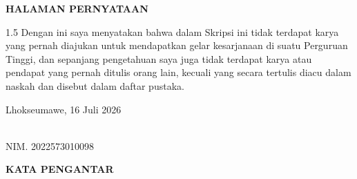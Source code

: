 \documentclass[12pt, a4paper, onecolumn, oneside]{report}
\begin{document}
\newpage
{}
{}
\begin{center}
{\fontsize{14pt}{16pt}\selectfont\bfseries HALAMAN PERNYATAAN}
\end{center}
\vspace{0.5cm}

\begin{spacing}{1.5}
\noindent Dengan ini saya menyatakan bahwa dalam Skripsi ini tidak terdapat karya yang pernah diajukan untuk mendapatkan gelar kesarjanaan di suatu Perguruan Tinggi, dan sepanjang pengetahuan saya juga tidak terdapat karya atau pendapat yang pernah ditulis orang lain, kecuali yang secara tertulis diacu dalam naskah dan disebut dalam daftar pustaka.

\vspace{3cm}

\begin{flushright}
\begin{minipage}{5cm}
Lhokseumawe, 16 Juli 2026

\vspace{2cm}

\\
NIM. 2022573010098
\end{minipage}
\end{flushright}
\end{spacing}

\newpage
{}
{}
\begin{center}
{\fontsize{14pt}{16pt}\selectfont\bfseries KATA PENGANTAR}
\end{center}
\vspace{0.5cm}
\end{document}
